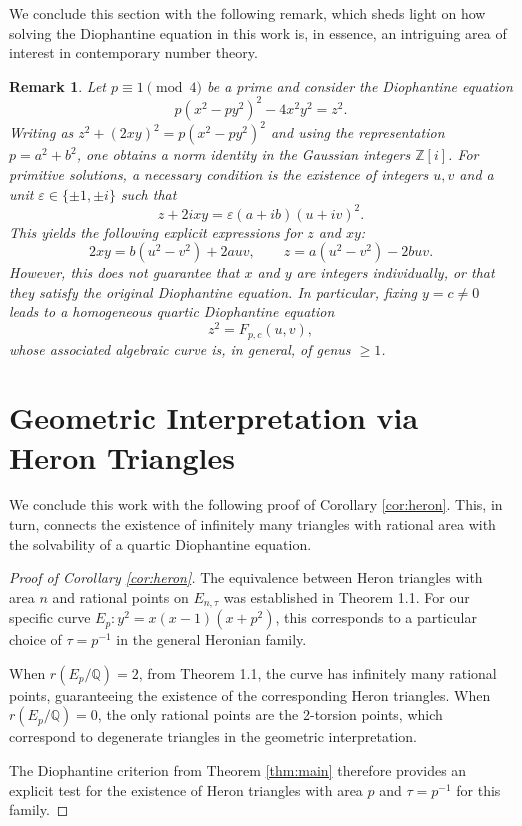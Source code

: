 \documentclass[10pt]{article}
\newtheorem{remark}[theorem]{Remark}
\begin{document}
We conclude this section with the following remark, which sheds light on how solving the Diophantine equation in this work is, in essence, an intriguing area of interest in contemporary number theory.

\begin{remark}\label{rem:gaussian}
Let \(p \equiv 1 \pmod{4}\) be a prime and consider the Diophantine equation
\[p(x^{2} - py^{2})^{2} - 4x^{2}y^{2} = z^{2}.\]
Writing as \(z^{2} + (2xy)^{2} = p(x^{2} - py^{2})^{2}\) and using the representation \(p = a^{2} + b^{2}\), one obtains a norm identity in the Gaussian integers \(\mathbb{Z}[i]\). For primitive solutions, a necessary condition is the existence of integers \(u, v\) and a unit \(\varepsilon \in \{\pm1, \pm i\}\) such that
\[z + 2i xy = \varepsilon (a + ib)(u + iv)^{2}.\]
This yields the following explicit expressions for \(z\) and \(xy\):
\[2xy = b(u^{2} - v^{2}) + 2auv, \qquad z = a(u^{2} - v^{2}) - 2buv.\]
However, this does not guarantee that \(x\) and \(y\) are integers individually, or that they satisfy the original Diophantine equation. In particular, fixing \(y = c \neq 0\) leads to a homogeneous quartic Diophantine equation
\[z^{2} = F_{p,c}(u,v),\]
whose associated algebraic curve is, in general, of genus \(\geq 1\).
\end{remark}

\section{Geometric Interpretation via Heron Triangles}

We conclude this work with the following proof of Corollary \ref{cor:heron}. This, in turn, connects the existence of infinitely many triangles with rational area with the solvability of a quartic Diophantine equation.

\begin{proof}[Proof of Corollary \ref{cor:heron}]
The equivalence between Heron triangles with area \(n\) and rational points on \(E_{n,\tau}\) was established in Theorem 1.1. For our specific curve \(E_{p}: y^{2} = x(x-1)(x+p^{2})\), this corresponds to a particular choice of \(\tau = p^{-1}\) in the general Heronian family.

When \(r(E_{p}/\mathbb{Q}) = 2\), from Theorem 1.1, the curve has infinitely many rational points, guaranteeing the existence of the corresponding Heron triangles. When \(r(E_{p}/\mathbb{Q}) = 0\), the only rational points are the 2-torsion points, which correspond to degenerate triangles in the geometric interpretation.

The Diophantine criterion from Theorem \ref{thm:main} therefore provides an explicit test for the existence of Heron triangles with area \(p\) and \(\tau = p^{-1}\) for this family.
\end{proof}
\end{document}
